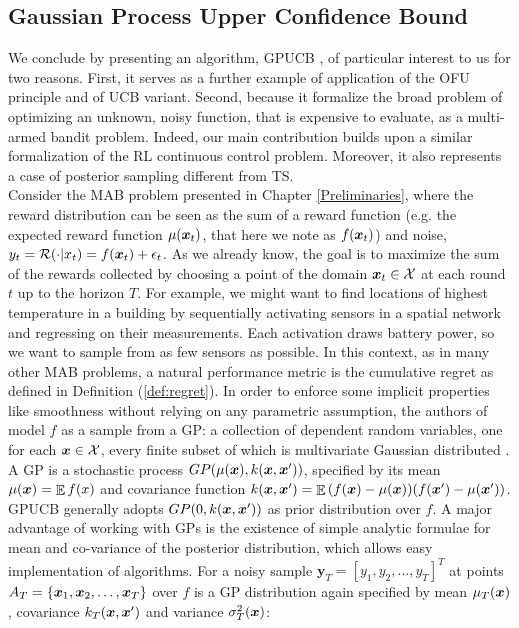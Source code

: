 \subsection{Gaussian Process Upper Confidence Bound}
We conclude by presenting an algorithm, \gls{GPUCB} \cite{srinivas2010gaussian}, of particular interest to us for two reasons. First, it serves as a further example of application of the \gls{OFU} principle and of \gls{UCB} variant. Second, because it formalize the broad problem of optimizing an unknown, noisy function, that is expensive to evaluate, as a multi-armed bandit problem. Indeed, our main contribution builds upon a similar formalization of the \gls{RL} continuous control problem. Moreover, it also represents a case of posterior sampling different from \gls{TS}. \\
Consider the \gls{MAB} problem presented in Chapter \ref{Preliminaries}, where the reward distribution can be seen as the sum of a reward function (e.g. the expected reward function $\mu(\boldsymbol{x}_t)$, that here we note as $f(\boldsymbol{x}_t)$) and noise, \ie $y_t = \mathcal{R}(\cdot|x_t) = f(\boldsymbol{x}_t) + \epsilon_t$. As we already know, the goal is to maximize the sum of the rewards collected by choosing a point of the domain $\boldsymbol{x}_t\in\mathcal{X}$ at each round $t$ up to the horizon $T$. For example, we might want to find locations of highest temperature in a building by sequentially activating sensors in a spatial network and regressing on their measurements. Each activation draws battery power, so we want to sample from as few sensors as possible.  In this context, as in many other \gls{MAB} problems, a natural performance metric is the cumulative regret as defined in Definition (\ref{def:regret}). 
In order to enforce some implicit properties like smoothness without relying on any parametric assumption, the authors of \cite{srinivas2010gaussian} model $f$ as a sample from a \gls{GP}: a collection of dependent random variables, one for each $\boldsymbol{x}\in\mathcal{X}$, every finite subset of which is multivariate Gaussian distributed \cite{williams2006gaussian}. A \gls{GP} is a stochastic process $GP(\mu(\boldsymbol{x}), k(\boldsymbol{x},\boldsymbol{x}'))$, specified by its mean $\mu(\boldsymbol{x}) = \mathop{\mathbb{E}}{f(x)}$ and covariance function $k(\boldsymbol{x},\boldsymbol{x}') = \mathop{\mathbb{E}}{(f(\boldsymbol{x})-\mu(\boldsymbol{x}))(f(\boldsymbol{x}')-\mu(\boldsymbol{x}'))}$. \gls{GPUCB} generally adopts $GP(0,k(\boldsymbol{x},\boldsymbol{x}'))$ as prior distribution over $f$.  A major advantage of working with GPs is the existence of simple analytic formulae for mean and co-variance of the posterior distribution, which allows easy implementation of algorithms. For a noisy sample $\boldsymbol{y}_T = [y_1,y_2,\dots, y_T]^T$ at points $A_T = \{\boldsymbol{x}_1,\boldsymbol{x}_2,\dots,\boldsymbol{x}_T\}$ over $f$ is a GP distribution again specified by mean $\mu_T(\boldsymbol{x})$, covariance $k_T(\boldsymbol{x},\boldsymbol{x}')$ and variance $\sigma^2_T(\boldsymbol{x})$:

